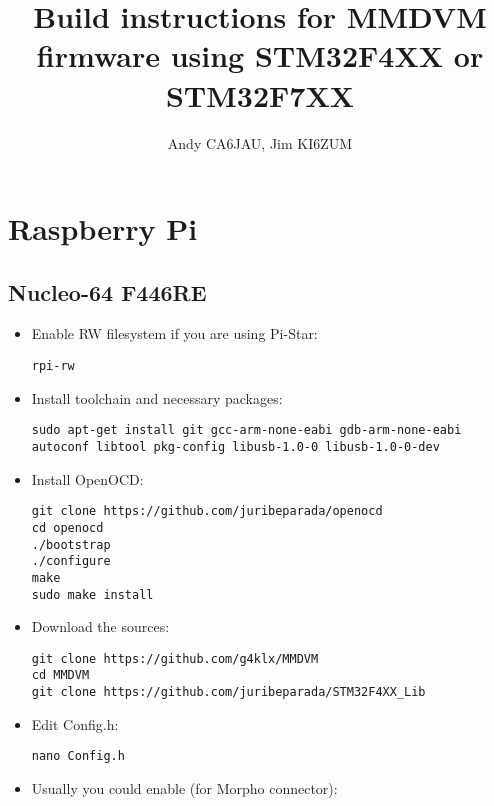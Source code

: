 \documentclass[]{article}
\title{Build instructions for MMDVM firmware using STM32F4XX or STM32F7XX}
\author{Andy CA6JAU, Jim KI6ZUM}
\begin{document}
\maketitle
\tableofcontents

\section{Raspberry Pi}

\subsection{Nucleo-64 F446RE}

\begin{itemize}[leftmargin=*]
\item Enable RW filesystem if you are using Pi-Star:
\begin{lstlisting}[style=DOS]
rpi-rw
\end{lstlisting}

\item Install toolchain and necessary packages:

\begin{lstlisting}[style=DOS]
sudo apt-get install git gcc-arm-none-eabi gdb-arm-none-eabi autoconf libtool pkg-config libusb-1.0-0 libusb-1.0-0-dev
\end{lstlisting}

\item Install OpenOCD:

\begin{lstlisting}[style=DOS]
git clone https://github.com/juribeparada/openocd
cd openocd
./bootstrap
./configure
make
sudo make install
\end{lstlisting}

\item Download the sources:

\begin{lstlisting}[style=DOS]
git clone https://github.com/g4klx/MMDVM
cd MMDVM
git clone https://github.com/juribeparada/STM32F4XX_Lib
\end{lstlisting}

\item Edit Config.h:

\begin{lstlisting}[style=DOS]
nano Config.h
\end{lstlisting}

\item Usually you could enable (for Morpho connector):


\end{itemize}
\end{document}

